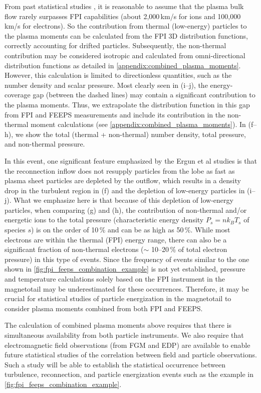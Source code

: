 \documentclass[draft]{agujournal2019}
\begin{document}
From past statistical studies \cite{Huang2020,Chong2022}, it is reasonable to assume that the plasma bulk flow rarely surpasses FPI capabilities (about 2,000\,\si{km/s} for ions and 100,000\,\si{km/s} for electrons). So the contribution from thermal (low-energy) particles to the plasma moments can be calculated from the FPI 3D distribution functions, correctly accounting for drifted particles. Subsequently, the non-thermal contribution may be considered isotropic and calculated from omni-directional distribution functions as detailed in \ref{appendix:combined_plasma_moments}. However, this calculation is limited to directionless quantities, such as the number density and scalar pressure. Most clearly seen in (i--j), the energy-coverage gap (between the dashed lines) may contain a significant contribution to the plasma moments. Thus, we extrapolate the distribution function in this gap from FPI and FEEPS measurements and include its contribution in the non-thermal moment calculations (see \ref{appendix:combined_plasma_moments}). In (f--h), we show the total (thermal + non-thermal) number density, total pressure, and non-thermal pressure.

In this event, one significant feature emphasized by the Ergun et al studies is that the reconnection inflow does not resupply particles from the lobe as fast as plasma sheet particles are depleted by the outflow, which results in a density drop in the turbulent region in (f) and the depletion of low-energy particles in (i--j). What we emphasize here is that because of this depletion of low-energy particles, when comparing (g) and (h), the contribution of non-thermal and/or energetic ions to the total pressure (characteristic energy density ${P_s=nk_BT_s}$ of species $s$) is on the order of 10\,\% and can be as high as 50\,\%. While most electrons are within the thermal (FPI) energy range, there can also be a significant fraction of non-thermal electrons ($\sim$ 10--20\,\% of total electron pressure) in this type of events. Since the frequency of events similar to the one shown in \cref{fig:fpi_feeps_combination_example} is not yet established, pressure and temperature calculations solely based on the FPI instrument in the magnetotail may be underestimated for these occurrences. Therefore, it may be crucial for statistical studies of particle energization in the magnetotail to consider plasma moments combined from both FPI and FEEPS.

The calculation of combined plasma moments above requires that there is simultaneous availability from both particle instruments. We also require that electromagnetic field observations (from FGM and EDP) are available to enable future statistical studies of the correlation between field and particle observations. Such a study will be able to establish the statistical occurrence between turbulence, reconnection, and particle energization events such as the example in \cref{fig:fpi_feeps_combination_example}.
\end{document}
